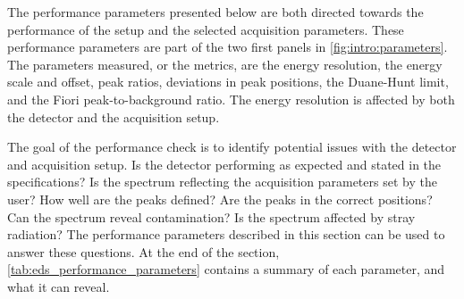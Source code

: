 



The performance parameters presented below are both directed towards the performance of the setup and the selected acquisition parameters.
These performance parameters are part of the two first panels in \cref{fig:intro:parameters}.
The parameters measured, or the metrics, are the energy resolution, the energy scale and offset, peak ratios, deviations in peak positions, the Duane-Hunt limit, and the Fiori peak-to-background ratio.
The energy resolution is affected by both the detector and the acquisition setup.


The goal of the performance check is to identify potential issues with the detector and acquisition setup.
Is the detector performing as expected and stated in the specifications?
Is the spectrum reflecting the acquisition parameters set by the user?
How well are the peaks defined?
Are the peaks in the correct positions?
Can the spectrum reveal contamination?
Is the spectrum affected by stray radiation?
The performance parameters described in this section can be used to answer these questions.
At the end of the section, \cref{tab:eds_performance_parameters} contains a summary of each parameter, and what it can reveal.


